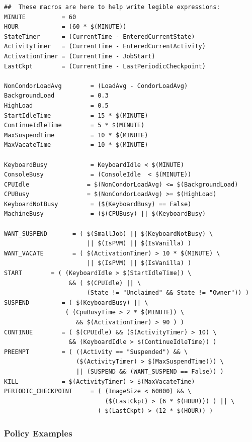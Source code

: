 \begin{verbatim}
##  These macros are here to help write legible expressions:
MINUTE          = 60
HOUR            = (60 * $(MINUTE))
StateTimer      = (CurrentTime - EnteredCurrentState)
ActivityTimer   = (CurrentTime - EnteredCurrentActivity)
ActivationTimer = (CurrentTime - JobStart)
LastCkpt        = (CurrentTime - LastPeriodicCheckpoint)

NonCondorLoadAvg        = (LoadAvg - CondorLoadAvg)
BackgroundLoad          = 0.3
HighLoad                = 0.5
StartIdleTime           = 15 * $(MINUTE)
ContinueIdleTime        = 5 * $(MINUTE)
MaxSuspendTime          = 10 * $(MINUTE)
MaxVacateTime           = 10 * $(MINUTE)

KeyboardBusy            = KeyboardIdle < $(MINUTE)
ConsoleBusy             = (ConsoleIdle  < $(MINUTE))
CPUIdle                = $(NonCondorLoadAvg) <= $(BackgroundLoad)
CPUBusy                = $(NonCondorLoadAvg) >= $(HighLoad)
KeyboardNotBusy         = ($(KeyboardBusy) == False)
MachineBusy             = ($(CPUBusy) || $(KeyboardBusy)

WANT_SUSPEND       = ( $(SmallJob) || $(KeyboardNotBusy) \
                       || $(IsPVM) || $(IsVanilla) )
WANT_VACATE        = ( $(ActivationTimer) > 10 * $(MINUTE) \
                       || $(IsPVM) || $(IsVanilla) )
START        = ( (KeyboardIdle > $(StartIdleTime)) \
                  && ( $(CPUIdle) || \
                       (State != "Unclaimed" && State != "Owner")) )
SUSPEND         = ( $(KeyboardBusy) || \
                 ( (CpuBusyTime > 2 * $(MINUTE)) \
                    && $(ActivationTimer) > 90 ) )
CONTINUE        = ( $(CPUIdle) && ($(ActivityTimer) > 10) \
                  && (KeyboardIdle > $(ContinueIdleTime)) )
PREEMPT	        = ( ((Activity == "Suspended") && \
                    ($(ActivityTimer) > $(MaxSuspendTime))) \
                    || (SUSPEND && (WANT_SUSPEND == False)) )
KILL            = $(ActivityTimer) > $(MaxVacateTime)
PERIODIC_CHECKPOINT     = ( (ImageSize < 60000) && \
                            ($(LastCkpt) > (6 * $(HOUR))) ) || \ 
                          ( $(LastCkpt) > (12 * $(HOUR)) )
\end{verbatim}

\subsubsection{\label{sec:Policy-Examples}
Policy Examples}

